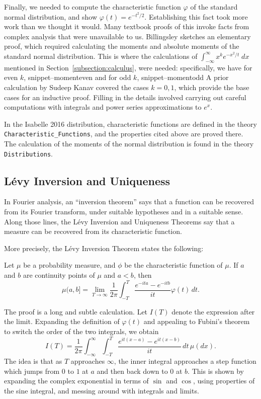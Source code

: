 \documentclass{svjour3}
\newcommand{\ph}{\varphi}
\newcommand{\Snippet}[1]{\csname snippet--#1\endcsname}
\begin{document}
Finally, we needed to compute the characteristic function $\ph$ of the standard normal distribution, and show $\ph(t) = e^{-t^2/2}$. Establishing this fact took more work than we thought it would. Many textbook proofs of this invoke facts from complex analysis that were unavailable to us. Billingsley \cite[page 344]{billingsley:95} sketches an elementary proof, which required calculating the moments and absolute moments of the standard normal distribution. This is where the calculations of $\int_{-\infty}^\infty x^k e^{-x^2 / t} \; dx$ mentioned in Section~\ref{subsection:calculus}, were needed: specifically, we have for even $k$, 
\Snippet{momenteven}
and for odd $k$,
\Snippet{momentodd}
A prior calculation by Sudeep Kanav covered the cases $k = 0, 1$, which provide the base cases for an inductive proof. Filling in the details involved carrying out careful computations with integrals and power series approximations to $e^x$.

In the Isabelle 2016 distribution, characteristic functions are defined in the theory \verb=Characteristic_Functions=, and the properties cited above are proved there. The calculation of the moments of the normal distribution is found in the theory \verb=Distributions=.

\subsection{L\'evy Inversion and Uniqueness}

In Fourier analysis, an ``inversion theorem'' says that a function can be recovered from its Fourier transform, under suitable hypotheses and in a suitable sense. Along those lines, the L\'evy Inversion and Uniqueness Theorems say that a measure can be recovered from its characteristic function. 

More precisely, the L\'evy Inversion Theorem states the following:
\begin{theorem}
Let $\mu$ be a probability measure, and $\phi$ be the characteristic function of $\mu$. If $a$ and $b$ are continuity points of $\mu$ and $a < b$, then
\[ 
\mu (a,b] = \lim_{T \rightarrow \infty} \frac{1}{2\pi} \int_{-T}^T \frac{e^{-ita} - e^{-itb}}{it} \ph(t) \, dt. 
\]
\end{theorem}

The proof is a long and subtle calculation. Let $I(T)$ denote the expression after the limit. Expanding the definition of $\ph(t)$ and appealing to Fubini's theorem to switch the order of the two integrals, we obtain
\[
I(T) = \frac{1}{2\pi} \int_{-\infty}^\infty \int_{-T}^T \frac{e^{it(x-a)} - e^{it(x-b)}}{it} \, dt \, \mu(dx). 
\]
The idea is that as $T$ approaches $\infty$, the inner integral approaches a step function which jumps from $0$ to $1$ at $a$ and then back down to $0$ at $b$. This is shown by expanding the complex exponential in terms of $\sin$ and $\cos$, using properties of the sine integral, and messing around with integrals and limits.
\end{document}
